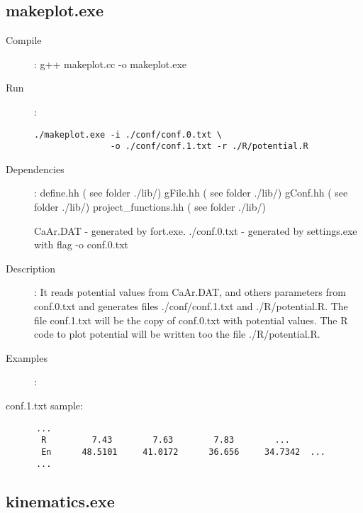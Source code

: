 \documentclass[preprint,review,12pt]{elsarticle}
\begin{document}
  \subsection{makeplot.exe}

  \label{sec:makeplot}
    \begin{description}
       \item[Compile]:  g++ makeplot.cc -o makeplot.exe
       \item[Run]:
    \begin{verbatim}
./makeplot.exe -i ./conf/conf.0.txt \
               -o ./conf/conf.1.txt -r ./R/potential.R
    \end{verbatim}  

     
       \item [Dependencies]:
           \subitem define.hh              ( see folder ./lib/)
           \subitem gFile.hh               ( see folder ./lib/)
           \subitem gConf.hh               ( see folder ./lib/)
           \subitem project\_functions.hh   ( see folder ./lib/)

           \subitem CaAr.DAT - generated by fort.exe. 
           \subitem ./conf.0.txt  - generated by settings.exe with flag -o conf.0.txt  
           
       \item [Description]:
          It reads potential values from CaAr.DAT, and others parameters from conf.0.txt and generates files ./conf/conf.1.txt and ./R/potential.R. 
          The file conf.1.txt will be the copy of conf.0.txt with potential values. The R code to plot potential will be written too the file ./R/potential.R.
          
       \item [Examples]:
    \end{description}
      conf.1.txt sample:
    \begin{verbatim}
      ...
       R         7.43        7.63        7.83        ...
       En      48.5101     41.0172      36.656     34.7342  ...
      ...
    \end{verbatim}  


  \subsection{kinematics.exe}
  \label{sec:potential}
\end{document}

